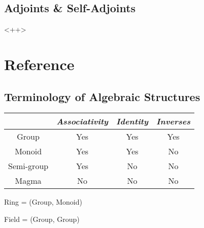 \documentclass[11pt,a4paper]{article}
\begin{document}
\subsection{Adjoints \& Self-Adjoints}
<++>

\section{Reference}

\subsection{Terminology of Algebraic Structures}

\begin{tabular}{cccc}
    \toprule
               & \emph{Associativity} & \emph{Identity} & \emph{Inverses} \\
               \midrule
    Group      & Yes                  & Yes             & Yes \\
    Monoid     & Yes                  & Yes             & No  \\
    Semi-group & Yes                  & No              & No  \\
    Magma      & No                   & No              & No  \\
    \bottomrule
\end{tabular}

Ring  = (Group, Monoid)

Field = (Group, Group)
\end{document}
